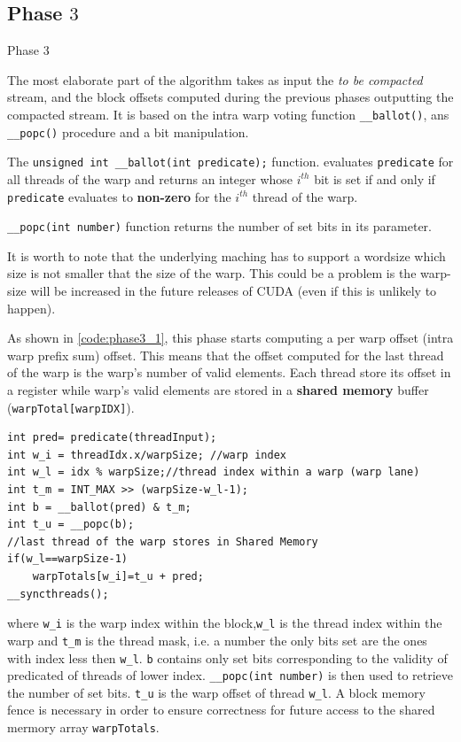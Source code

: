 \subsection{Phase $3$}
Phase 3

The most elaborate part of the algorithm takes as input the \textit{to be compacted} stream, and the block offsets computed during the previous phases outputting the compacted stream.
It is based on the intra warp voting function \texttt{\_\_ballot()}, ans \texttt{\_\_popc()} procedure and a bit manipulation. 

The \verb|unsigned int __ballot(int predicate);| function.
evaluates \verb|predicate| for all threads of the warp and 
returns an integer whose $i^{th}$ bit is set if and only if \verb|predicate| evaluates to \textbf{non-zero} for the $i^{th}$ thread of the warp.

\verb|__popc(int number)| function returns the number of set bits in its parameter.

It is worth to note that the underlying maching has to support a wordsize which size is not smaller that the size of the warp. This could be a problem is the warp-size will be increased in the future releases of CUDA (even if this is unlikely to happen).

As shown in \ref{code:phase3_1}, this phase starts computing a per warp offset (intra warp prefix sum) offset. This means that the offset computed for the last thread of the warp is the warp's number of valid elements. Each thread  store its offset in a register while warp's valid elements are stored in a \textbf{shared memory} buffer (\verb|warpTotal[warpIDX]|). 
\begin{lstlisting}
int pred= predicate(threadInput);
int w_i = threadIdx.x/warpSize; //warp index
int w_l = idx % warpSize;//thread index within a warp (warp lane)
int t_m = INT_MAX >> (warpSize-w_l-1);
int b = __ballot(pred) & t_m;
int t_u = __popc(b);
//last thread of the warp stores in Shared Memory
if(w_l==warpSize-1)
	warpTotals[w_i]=t_u + pred;
__syncthreads();
\end{lstlisting}
where \verb|w_i| is the warp index within the block,\verb|w_l| is the thread index within the warp and \verb|t_m| is the thread mask, i.e. a number the only bits set are the ones with index less then \verb|w_l|. \verb|b| contains only set bits corresponding to the validity of predicated of threads of lower index. \verb|__popc(int number)| is then used to retrieve the number of set bits. \verb|t_u| is the warp offset of thread \verb|w_l|.
A block memory fence is necessary in order to ensure correctness for future access to the shared mermory array \verb|warpTotals|.

